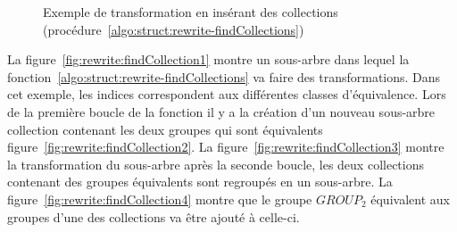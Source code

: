 \begin{figure}[htb]
    \caption[Exemple de transformation en insérant des collections]{Exemple de transformation en insérant des collections (procédure~\ref{algo:struct:rewrite-findCollections})}
    \label{fig:rewrite:findCollections}
\end{figure}

\begin{example}
    La figure~\ref{fig:rewrite:findCollection1} montre un sous-arbre dans lequel la fonction~\ref{algo:struct:rewrite-findCollections} va faire des transformations.
    Dans cet exemple, les indices correspondent aux différentes classes d'équivalence.
    Lors de la première boucle de la fonction il y a la création d'un nouveau sous-arbre collection contenant les deux groupes qui sont équivalents figure~\ref{fig:rewrite:findCollection2}.
    La figure~\ref{fig:rewrite:findCollection3} montre la transformation du sous-arbre après la seconde boucle, les deux collections contenant des groupes équivalents sont regroupés en un sous-arbre.
    La figure~\ref{fig:rewrite:findCollection4} montre que le groupe $GROUP_2$ équivalent aux groupes d'une des collections va être ajouté à celle-ci.
\end{example} 

    
       
